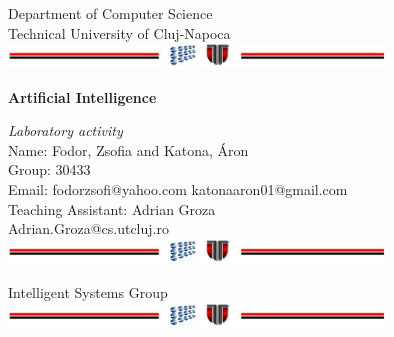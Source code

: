 \documentclass[a4paper,12pt]{report}
\begin{document}
\vspace{-5cm}
\begin{center}
Department of Computer Science\\
Technical University of Cluj-Napoca\\
\includegraphics[width=10cm]{fig/footer}
\end{center}
\vspace{1cm}
\begin{center}
\begin{Large}
 \textbf{Artificial Intelligence}\\
\end{Large}
\textit{Laboratory activity}\\
\vspace{3cm}
Name: Fodor, Zsofia and Katona, Áron\\
Group: 30433\\
Email: fodorzsofi@yahoo.com katonaaron01@gmail.com\\
\vspace{12cm}
Teaching Assistant: Adrian Groza\\
Adrian.Groza@cs.utcluj.ro\\
\vspace{1cm}
\includegraphics[width=10cm]{fig/footer}
\end{center}

\tableofcontents












\appendix



\vspace{2cm}
\begin{center}
Intelligent Systems Group\\
\includegraphics[width=10cm]{fig/footer}
\end{center}
\end{document}
